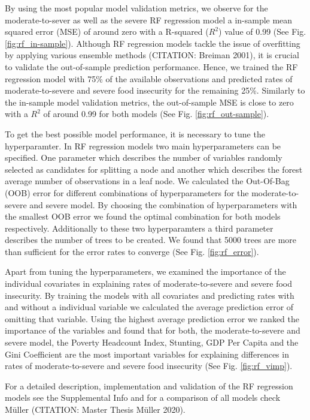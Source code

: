 \documentclass{article}
\begin{document}
By using the most popular model validation metrics, we observe for the moderate-to-sever as well as the severe RF regression model a in-sample mean squared error (MSE) of around zero with a R-squared (${R}^2$) value of 0.99 (See Fig. \ref{fig:rf_in-sample}). Although RF regression models tackle the issue of overfitting by applying various ensemble methods (CITATION: Breiman 2001), it is crucial to validate the out-of-sample prediction performance. Hence, we trained the RF regression model with 75\% of the available observations and predicted rates of moderate-to-severe and severe food insecurity for the remaining 25\%. Similarly to the in-sample model validation metrics, the out-of-sample MSE is close to zero with a ${R}^2$ of around 0.99 for both models (See Fig. \ref{fig:rf_out-sample}).

To get the best possible model performance, it is necessary to tune the hyperparamter. In RF regression models two main hyperparameters can be specified. One parameter which describes the number of variables randomly selected as candidates for splitting a node and another which describes the forest average number of observations in a leaf node. We calculated the Out-Of-Bag (OOB) error for different combinations of hyperparameters for the moderate-to-severe and severe model. By choosing the combination of hyperparameters with the smallest OOB error we found the optimal combination for both models respectively. Additionally to these two hyperparamters a third parameter describes the number of trees to be created. We found that 5000 trees are more than sufficient for the error rates to converge (See Fig. \ref{fig:rf_error}).

Apart from tuning the hyperparameters, we examined the importance of the individual covariates in explaining rates of moderate-to-severe and severe food insecurity. By training the models with all covariates and predicting rates with and without a individual variable we calculated the average prediction error of omitting that variable. Using the highest average prediction error we ranked the importance of the variables and found that for both, the moderate-to-severe and severe model, the Poverty Headcount Index, Stunting, GDP Per Capita and the Gini Coefficient are the most important variables for explaining differences in rates of moderate-to-severe and severe food insecurity (See Fig. \ref{fig:rf_vimp}).

For a detailed description, implementation and validation of the RF regression models see the Supplemental Info and for a comparison of all models check M\"uller (CITATION: Master Thesis M\"uller 2020).
\end{document}
